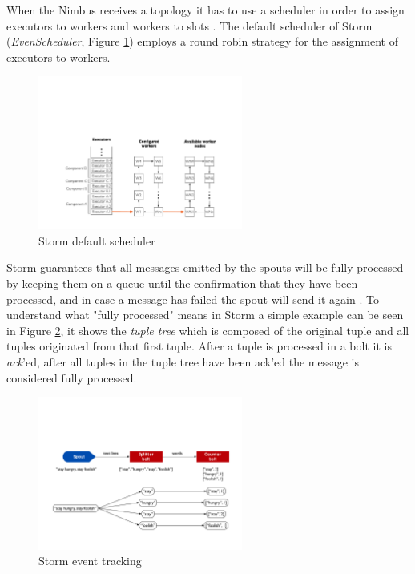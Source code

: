 \documentclass[ppgc,diss,english]{iiufrgs}
\begin{document}
When the Nimbus receives a topology it has to use a scheduler in order to assign executors to workers and workers to slots \cite{aniello2013adaptive}. The default scheduler of Storm (\emph{EvenScheduler}, Figure \ref{fig:storm_default_scheduler}) employs a round robin strategy for the assignment of executors to workers.

\begin{figure}[!ht]
	\centering
	\includegraphics[width=0.6\textwidth]{images/storm/default_scheduler.pdf}
	\caption[Storm default scheduler]{Storm default scheduler \cite{heinze2014cloud}}
	\label{fig:storm_default_scheduler}
\end{figure}

Storm guarantees that all messages emitted by the spouts will be fully processed by keeping them on a queue until the confirmation that they have been processed, and in case a message has failed the spout will send it again \cite{gradvohl2014comparing}. To understand what "fully processed" means in Storm a simple example can be seen in Figure \ref{fig:storm_event_tracking}, it shows the \emph{tuple tree} which is composed of the original tuple and all tuples originated from that first tuple. After a tuple is processed in a bolt it is \emph{ack}'ed, after all tuples in the tuple tree have been ack'ed the message is considered fully processed.

\begin{figure}[!ht]
	\centering
	\includegraphics[width=0.6\textwidth]{images/storm/event_tracking.pdf}
	\caption[Storm event tracking]{Storm event tracking \cite{heinze2014cloud}}
	\label{fig:storm_event_tracking}
\end{figure}
\end{document}
